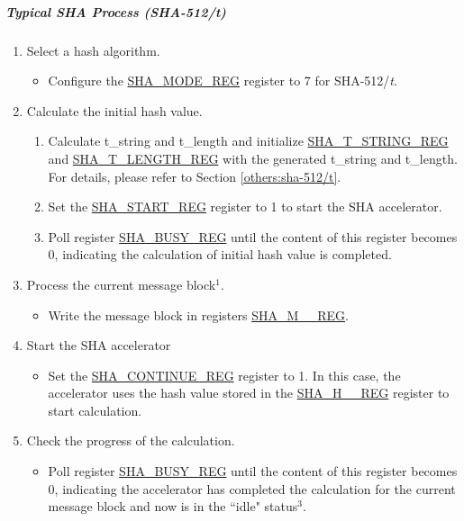 \documentclass[main\_\_EN.tex]{subfiles}
\begin{document}
\subparagraph{Typical SHA Process (SHA-512/{\it{t}})}

\begin{enumerate}
    \item \label{others:sha-sel-algorithm2} Select a hash algorithm.
    \begin{itemize}
        \item Configure the \hyperref[regdesc:SHAMODEREG]{SHA\_MODE\_REG} register to 7 for SHA-512/{\it{t}}.
    \end{itemize}
    \item Calculate the initial hash value.
        \begin{enumerate}
            \item Calculate t\_string and t\_length and initialize \hyperref[regdesc:SHATSTRINGREG]{SHA\_T\_STRING\_REG} and  \hyperref[regdesc:SHATLENGTHREG]{SHA\_T\_LENGTH\_REG} with the generated t\_string and t\_length. For details, please refer to Section \ref{others:sha-512/t}.
            \item Set the \hyperref[regdesc:SHASTARTREG]{SHA\_START\_REG} register to 1 to start the SHA accelerator.
            \item Poll register \hyperref[regdesc:SHABUSYREG]{SHA\_BUSY\_REG} until the content of this register becomes 0, indicating the calculation of initial hash value is completed.
        \end{enumerate}
    
    \item \label{others:sha-current-block1} Process the current message block\hyperref[others:sha-note-typical-sha]{$^1$}.
    \begin{itemize}
        \item Write the message block in registers \hyperref[regdesc:SHAMNREG]{SHA\_M\_\_REG}.
    \end{itemize}
    \item Start the SHA accelerator 
    \begin{itemize}
        \item Set the \hyperref[regdesc:SHACONTINUEREG]{SHA\_CONTINUE\_REG} register to 1. In this case, the accelerator uses the hash value stored in the \hyperref[regdesc:SHAHNREG]{SHA\_H\_\_REG} register to start calculation.
    \end{itemize}
    
    \item Check the progress of the calculation.
    \begin{itemize}
        \item Poll register \hyperref[regdesc:SHABUSYREG]{SHA\_BUSY\_REG} until the content of this register becomes 0, indicating the accelerator has completed the calculation for the current message block and now is in the ``idle" status\hyperref[others:sha-note-typical-sha]{$^3$}. 
    \end{itemize}
    

\end{enumerate}
\end{document}
